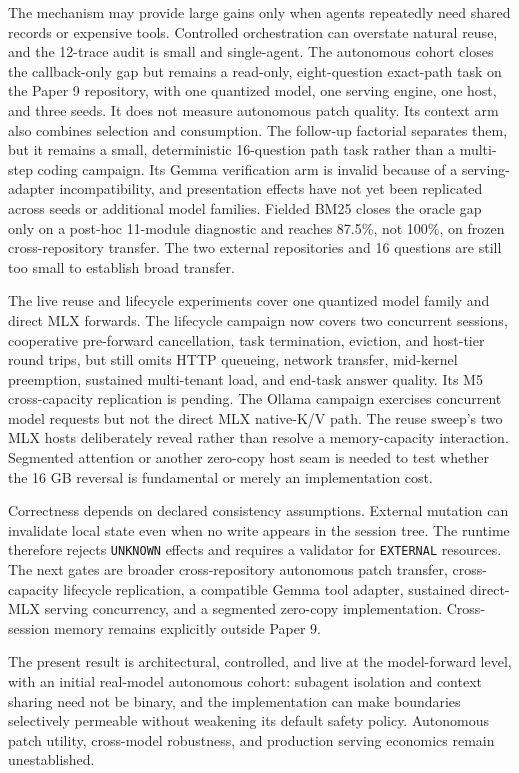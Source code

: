 \documentclass[11pt]{article}
\begin{document}
The mechanism may provide large gains only when agents repeatedly need shared
records or expensive tools. Controlled orchestration can overstate natural
reuse, and the 12-trace audit is small and single-agent. The autonomous cohort
closes the callback-only gap but remains a read-only, eight-question exact-path
task on the Paper 9 repository, with one quantized model, one serving engine,
one host, and three seeds. It does not measure autonomous patch quality. Its
context arm also combines selection and consumption. The follow-up factorial
separates them, but it remains a small, deterministic 16-question path task
rather than a multi-step coding campaign. Its Gemma verification arm is invalid
because of a serving-adapter incompatibility, and presentation effects have not
yet been replicated across seeds or additional model families.
Fielded BM25 closes the oracle gap only on a post-hoc 11-module diagnostic and
reaches 87.5\%, not 100\%, on frozen cross-repository transfer. The two external
repositories and 16 questions are still too small to establish broad transfer.

The live reuse and lifecycle experiments cover one quantized model family and
direct MLX forwards. The lifecycle campaign now covers two concurrent sessions,
cooperative pre-forward cancellation, task termination, eviction, and host-tier
round trips, but still omits HTTP queueing, network transfer, mid-kernel
preemption, sustained multi-tenant load, and end-task answer quality. Its M5
cross-capacity replication is pending. The Ollama campaign exercises concurrent
model requests but not the direct MLX native-K/V path. The reuse sweep's two MLX
hosts deliberately reveal rather than resolve a
memory-capacity interaction. Segmented attention or another zero-copy host seam
is needed to test whether the 16 GB reversal is fundamental or merely an
implementation cost.

Correctness depends on declared consistency assumptions. External mutation can
invalidate local state even when no write appears in the session tree. The
runtime therefore rejects \texttt{UNKNOWN} effects and requires a validator for
\texttt{EXTERNAL} resources. The next gates are broader cross-repository
autonomous patch transfer, cross-capacity lifecycle replication, a compatible
Gemma tool adapter, sustained direct-MLX serving concurrency, and a segmented
zero-copy implementation. Cross-session memory remains explicitly outside
Paper 9.

The present result is architectural, controlled, and live at the model-forward
level, with an initial real-model autonomous cohort: subagent isolation and
context sharing need not be binary, and the implementation can make boundaries
selectively permeable without weakening its default safety policy. Autonomous
patch utility, cross-model robustness, and production serving economics remain
unestablished.
\end{document}
